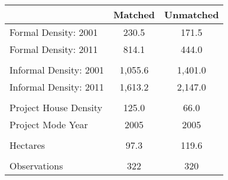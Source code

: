 \begin{tabu}{lcc}
 & Matched  & Unmatched  \\
\midrule
 Formal Density: 2001  & 230.5  & 171.5  \\ 
 Formal Density: 2011  & 814.1  & 444.0  \\ 
 &  &  \\ 
 Informal Density: 2001  & 1,055.6  & 1,401.0  \\ 
 Informal Density: 2011  & 1,613.2  & 2,147.0  \\ 
 &  &  \\ 
 Project House Density  & 125.0  & 66.0  \\ 
 Project Mode Year  & 2005  & 2005  \\ 
 &  &  \\ 
 Hectares  & 97.3  & 119.6  \\ 
 &  &  \\ 
\midrule
 Observations  & 322  & 320  \\ 
\bottomrule
\end{tabu}
